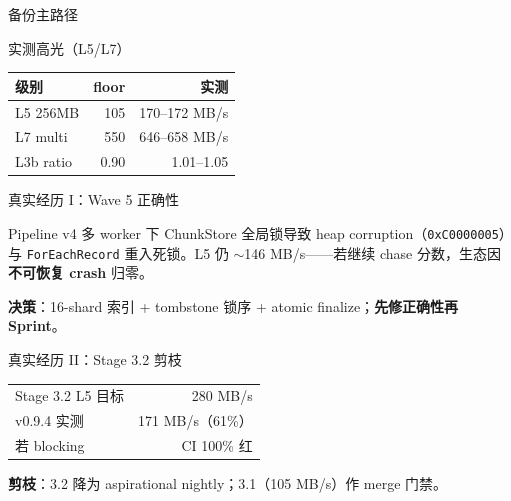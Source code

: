 \documentclass[aspectratio=169,12pt,fontset=none]{ctexbeamer}
\begin{document}
\begin{frame}{备份主路径}
  \resizebox{0.92\textwidth}{!}{%
    
  }
\end{frame}

\begin{frame}{实测高光（L5/L7）}
  \begin{table}
    \centering\small
    \begin{tabular}{@{}lrr@{}}
    \toprule
    级别 & floor & 实测 \\
    \midrule
    L5 256MB & 105 & 170--172 MB/s \\
    L7 multi & 550 & 646--658 MB/s \\
    L3b ratio & 0.90 & 1.01--1.05 \\
    \bottomrule
    \end{tabular}
  \end{table}
\end{frame}

\begin{frame}{真实经历 I：Wave 5 正确性}
  \begin{pressbox}[P3 爆发 — \vtag{0.9.0}]
    Pipeline v4 多 worker 下 ChunkStore 全局锁导致 heap corruption（\texttt{0xC0000005}）与 \texttt{ForEachRecord} 重入死锁。L5 仍 $\sim$146 MB/s——若继续 chase 分数，生态因\textbf{不可恢复 crash} 归零。
  \end{pressbox}
  \vspace{0.3em}
  \textbf{决策}：16-shard 索引 + tombstone 锁序 + atomic finalize；\textbf{先修正确性再 Sprint}。
\end{frame}

\begin{frame}{真实经历 II：Stage 3.2 剪枝}
  \begin{table}
    \centering\small
    \begin{tabular}{@{}lr@{}}
    \toprule
    Stage 3.2 L5 目标 & 280 MB/s \\
    v0.9.4 实测 & 171 MB/s（61\%） \\
    若 blocking & CI 100\% 红 \\
  \bottomrule
    \end{tabular}
  \end{table}
  \textbf{剪枝}：3.2 降为 aspirational nightly；3.1（105 MB/s）作 merge 门禁。
\end{frame}
\end{document}

